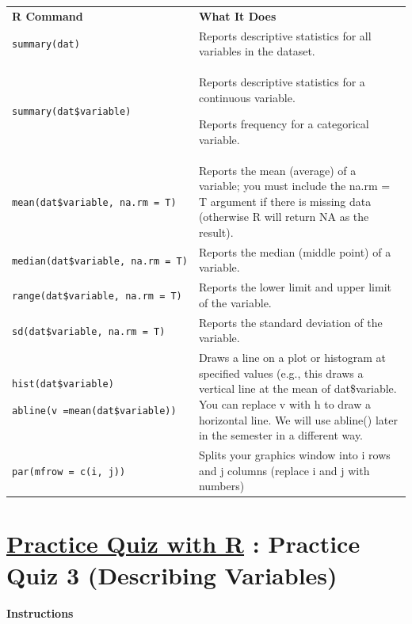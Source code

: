 \documentclass[
  letterpaper,
  DIV=11,
  numbers=noendperiod,
  oneside]{scrreprt}
\begin{document}
\begin{longtable}[]{@{}
  >{\raggedright\arraybackslash}p{}
  >{\raggedright\arraybackslash}p{}@{}}
\toprule\noalign{}
\endhead
\bottomrule\noalign{}
\endlastfoot
\textbf{R Command} & \textbf{What It Does} \\
\texttt{summary(dat)} & Reports descriptive statistics for all variables
in the dataset. \\
\texttt{summary(dat\$variable)} & Reports descriptive statistics for a
continuous variable.

Reports frequency for a categorical variable. \\
\texttt{mean(dat\$variable,\ na.rm\ =\ T)} & Reports the mean (average)
of a variable; you must include the na.rm = T argument if there is
missing data (otherwise R will return NA as the result). \\
\texttt{median(dat\$variable,\ na.rm\ =\ T)} & Reports the median
(middle point) of a variable. \\
\texttt{range(dat\$variable,\ na.rm\ =\ T)} & Reports the lower limit
and upper limit of the variable. \\
\texttt{sd(dat\$variable,\ na.rm\ =\ T)} & Reports the standard
deviation of the variable. \\
\texttt{hist(dat\$variable)}

\texttt{abline(v\ =mean(dat\$variable))} & Draws a line on a plot or
histogram at specified values (e.g., this draws a vertical line at the
mean of dat\$variable. You can replace v with h to draw a horizontal
line. We will use abline() later in the semester in a different way. \\
\texttt{par(mfrow\ =\ c(i,\ j))} & Splits your graphics window into i
rows and j columns (replace i and j with numbers) \\
\end{longtable}

\section{\texorpdfstring{\href{https://docs.google.com/forms/d/e/1FAIpQLScJ2ZvwLv2D4SYXFN2NL-7M8-B3Acq9BXsS1HwJSPf-LnGx4w/viewform?usp=sf_link}{Practice
Quiz with R} : Practice Quiz 3 (Describing
Variables)}{Practice Quiz with R : Practice Quiz 3 (Describing Variables)}}\label{practice-quiz-with-r-practice-quiz-3-describing-variables}

\textbf{Instructions}
\end{document}
